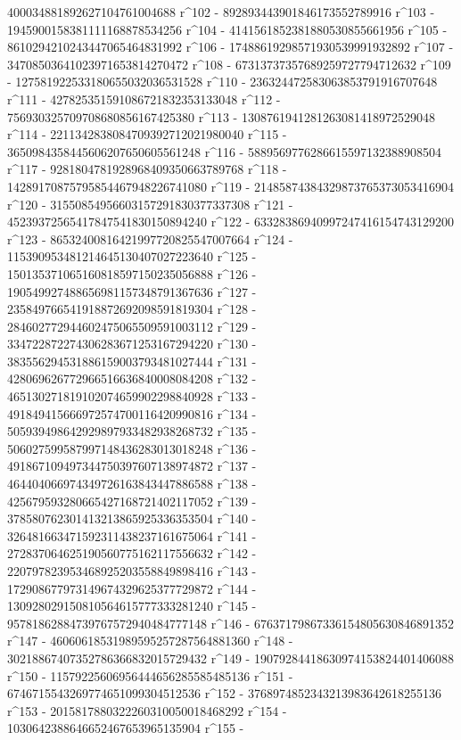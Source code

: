        400034881892627104761004688 r^102 - 
       892893443901846173552789916 r^103 - 
       1945900158381111168878534256 r^104 - 
       4141561852381880530855661956 r^105 - 
       8610294210243447065464831992 r^106 - 
       17488619298571930539991932892 r^107 - 
       34708503641023971653814270472 r^108 - 
       67313737357689259727794712632 r^109 - 
       127581922533180655032036531528 r^110 - 
       236324472583063853791916707648 r^111 - 
       427825351591086721832353133048 r^112 - 
       756930325709708680856167425380 r^113 - 
       1308761941281263081418972529048 r^114 - 
       2211342838084709392712021980040 r^115 - 
       3650984358445606207650605561248 r^116 - 
       5889569776286615597132388908504 r^117 - 
       9281804781928968409350663789768 r^118 - 
       14289170875795854467948226741080 r^119 - 
       21485874384329873765373053416904 r^120 - 
       31550854956603157291830377337308 r^121 - 
       45239372565417847541830150894240 r^122 - 
       63328386940997247416154743129200 r^123 - 
       86532400816421997720825547007664 r^124 - 
       115390953481214645130407027223640 r^125 - 
       150135371065160818597150235056888 r^126 - 
       190549927488656981157348791367636 r^127 - 
       235849766541918872692098591819304 r^128 - 
       284602772944602475065509591003112 r^129 - 
       334722872274306283671253167294220 r^130 - 
       383556294531886159003793481027444 r^131 - 
       428069626772966516636840008084208 r^132 - 
       465130271819102074659902298840928 r^133 - 
       491849415666972574700116420990816 r^134 - 
       505939498642929897933482938268732 r^135 - 
       506027599587997148436283013018248 r^136 - 
       491867109497344750397607138974872 r^137 - 
       464404066974349726163843447886588 r^138 - 
       425679593280665427168721402117052 r^139 - 
       378580762301413213865925336353504 r^140 - 
       326481663471592311438237161675064 r^141 - 
       272837064625190560775162117556632 r^142 - 
       220797823953468925203558849898416 r^143 - 
       172908677973149674329625377729872 r^144 - 
       130928029150810564615777333281240 r^145 - 
       95781862884739767572940484777148 r^146 - 
       67637179867336154805630846891352 r^147 - 
       46060618531989595257287564881360 r^148 - 
       30218867407352786366832015729432 r^149 - 
       19079284418630974153824401406088 r^150 - 
       11579225606956444656285585485136 r^151 - 
       6746715543269774651099304512536 r^152 - 
       3768974852343213983642618255136 r^153 - 
       2015817880322260310050018468292 r^154 - 
       1030642388646652467653965135904 r^155 - 
